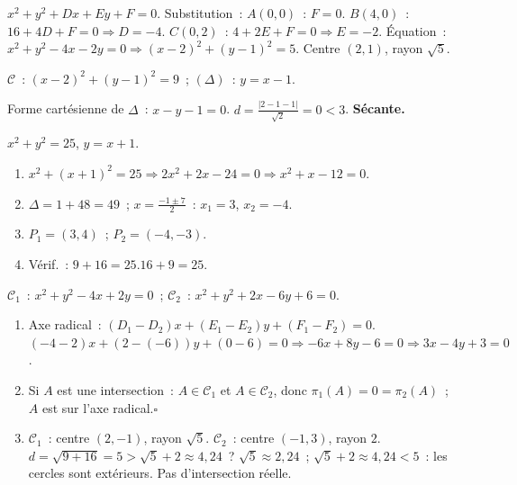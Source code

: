 
$x^2+y^2+Dx+Ey+F=0$. Substitution~:
$A(0,0)$~: $F=0$.
$B(4,0)$~: $16+4D+F=0\Rightarrow D=-4$.
$C(0,2)$~: $4+2E+F=0\Rightarrow E=-2$.
\'Equation~: $x^2+y^2-4x-2y=0\Rightarrow(x-2)^2+(y-1)^2=5$.
Centre $(2,1)$, rayon $\sqrt{5}$.


$\mathcal{C}$~: $(x-2)^2+(y-1)^2=9$~; $(\Delta)$~: $y=x-1$.

Forme cart\'esienne de $\Delta$~: $x-y-1=0$.
$d=\frac{|2-1-1|}{\sqrt{2}}=0<3$.
\textbf{S\'ecante.}


$x^2+y^2=25$, $y=x+1$.
\begin{enumerate}
  \item $x^2+(x+1)^2=25\Rightarrow2x^2+2x-24=0\Rightarrow x^2+x-12=0$.
  \item $\Delta=1+48=49$~; $x=\frac{-1\pm7}{2}$~: $x_1=3$, $x_2=-4$.
  \item $P_1=(3,4)$~; $P_2=(-4,-3)$.
  \item V\'erif.~: $9+16=25$.\checkmark\quad $16+9=25$.\checkmark
\end{enumerate}


$\mathcal{C}_1$~: $x^2+y^2-4x+2y=0$~; $\mathcal{C}_2$~: $x^2+y^2+2x-6y+6=0$.
\begin{enumerate}
  \item Axe radical~: $(D_1-D_2)x+(E_1-E_2)y+(F_1-F_2)=0$.
        $(-4-2)x+(2-(-6))y+(0-6)=0\Rightarrow-6x+8y-6=0\Rightarrow3x-4y+3=0$.
  \item Si $A$ est une intersection~: $A\in\mathcal{C}_1$ et $A\in\mathcal{C}_2$,
        donc $\pi_1(A)=0=\pi_2(A)$~; $A$ est sur l'axe radical.\hfill$\square$
  \item $\mathcal{C}_1$~: centre $(2,-1)$, rayon $\sqrt{5}$.
        $\mathcal{C}_2$~: centre $(-1,3)$, rayon $2$.
        $d=\sqrt{9+16}=5>\sqrt{5}+2\approx4{,}24$~?
        $\sqrt{5}\approx2{,}24$~; $\sqrt{5}+2\approx4{,}24<5$~: les cercles sont ext\'erieurs.
        Pas d'intersection r\'eelle.
\end{enumerate}

